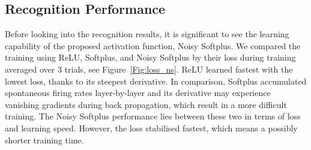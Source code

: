 \documentclass{article}
\begin{document}
\subsection{Recognition Performance}
\label{subsec:result_compare}
Before looking into the recognition results, it is significant to see the learning capability of the proposed activation function, Noisy Softplus.
We compared the training using ReLU, Softplus, and Noisy Softplus by their loss during training averaged over 3 trials, see Figure~\ref{Fig:loss_ns}.
ReLU learned fastest with the lowest loss, thanks to its steepest derivative.
In comparison, Softplus accumulated spontaneous firing rates layer-by-layer and its derivative may experience vanishing gradients during back propagation, which result in a more difficult training.
The Noisy Softplus performance lies between these two in terms of loss and learning speed.
However, the loss stabilised fastest, which means a possibly shorter training time.
\end{document}
